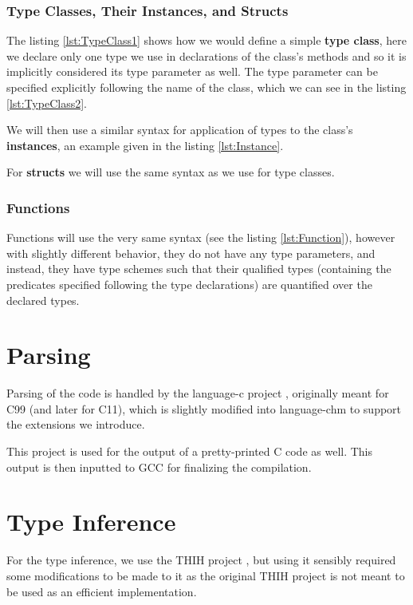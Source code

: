 \subsubsection{Type Classes, Their Instances, and Structs}

The listing \ref{lst:TypeClass1} shows how we would define a simple \textbf{type class}, here we declare only one type we use in declarations of the class's methods and so it is implicitly considered its type parameter as well. The type parameter can be specified explicitly following the name of the class, which we can see in the listing \ref{lst:TypeClass2}.

We will then use a similar syntax for application of types to the class's \textbf{instances}, an example given in the listing \ref{lst:Instance}.

For \textbf{structs} we will use the same syntax as we use for type classes.

\subsubsection{Functions}

Functions will use the very same syntax (see the listing \ref{lst:Function}), however with slightly different behavior, they do not have any type parameters, and instead, they have type schemes such that their qualified types (containing the predicates specified following the type declarations) are quantified over the declared types.

\section{Parsing}

Parsing of the code is handled by the language-c project \cite{visq2018language-c}, originally meant for C99 (and later for C11), which is slightly modified into language-chm to support the extensions we introduce.

This project is used for the output of a pretty-printed C code as well. This output is then inputted to GCC for finalizing the compilation.

\section{Type Inference}

For the type inference, we use the THIH project \cite{jones1999typing}, but using it sensibly required some modifications to be made to it as the original THIH project is not meant to be used as an efficient implementation.

